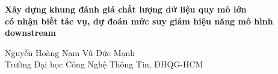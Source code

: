 \begin{center}
{\Large\bfseries Xây dựng khung đánh giá chất lượng dữ liệu quy mô lớn\\[2pt]
có nhận biết tác vụ, dự đoán mức suy giảm hiệu năng mô hình downstream\par}
\vspace{8pt}
{\normalsize Nguyễn Hoàng Nam \qquad Vũ Đức Mạnh\\
Trường Đại học Công Nghệ Thông Tin, ĐHQG-HCM\par}
\end{center}











\clearpage


\clearpage



